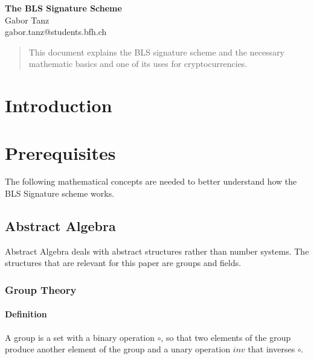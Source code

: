 \documentclass[a4paper,12pt]{scrartcl}
\begin{document}
\begin{titlepage}
\begin{center}
\vspace*{3cm}
\vspace{1cm}
\Huge \textbf{The BLS Signature Scheme} \\
\vspace{6cm}
\vspace{1cm}
\large Gabor Tanz \\ gabor.tanz@students.bfh.ch \\
\end{center}
\end{titlepage}

\tableofcontents
\pagebreak

\begin{abstract}
	This document explains the BLS signature scheme and the necessary mathematic basics and one of its uses for cryptocurrencies.
\end{abstract}
\pagebreak

\section{Introduction}
\pagebreak

\section{Prerequisites}
The following mathematical concepts are needed to better understand how the BLS Signature scheme works.
\subsection{Abstract Algebra}
Abstract Algebra deals with abstract structures rather than number systems. The structures that are relevant for this paper are groups and fields.
\subsubsection{Group Theory}

\paragraph{Definition}\hfill

A group is a set with a binary operation $\circ$, so that two elements of the group produce another element of the group and a unary operation $inv$ that inverses $\circ$.
\end{document}
